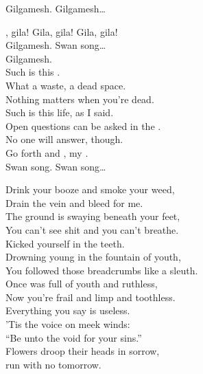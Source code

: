 Gilgamesh. Gilgamesh… \\


, gila! Gila, gila! Gila, gila! \\

Gilgamesh. Swan song… \\

Gilgamesh. \\

Such is this . \\
What a waste, a dead space. \\
Nothing matters when you're dead. \\
Such is this life, as I said. \\
Open questions can be asked in the . \\
No one will answer, though. \\
Go forth and , my . \\

Swan song. Swan song… \\




Drink your booze and smoke your weed, \\
Drain the vein and bleed for me. \\
The ground is swaying beneath your feet, \\
You can't see shit and you can't breathe. \\
Kicked yourself in the teeth. \\

Drowning young in the fountain of youth, \\
You followed those breadcrumbs like a sleuth. \\
Once was full of youth and ruthless, \\
Now you're frail and limp and toothless. \\
Everything you say is useless. \\

'Tis the  voice on meek winds: \\
``Be unto the void for your sins.'' \\
Flowers droop their heads in sorrow, \\
 run with no tomorrow. \\

